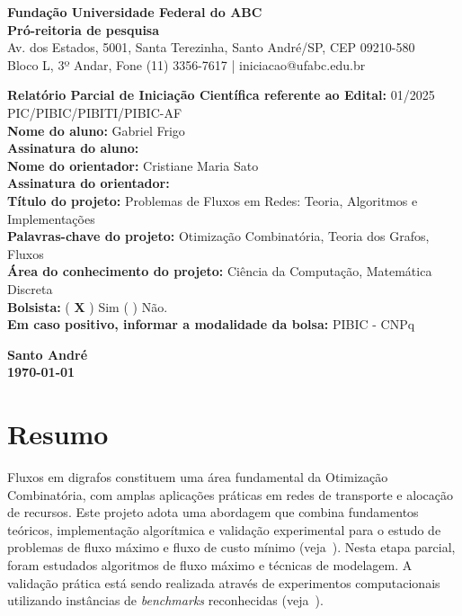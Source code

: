 \documentclass[12pt,a4paper]{article}
\begin{document}
\onehalfspacing

\begin{center}
    \textbf{Fundação Universidade Federal do ABC}\\
    \textbf{Pró-reitoria de pesquisa}\\
    \small Av. dos Estados, 5001, Santa Terezinha, Santo André/SP, CEP 09210-580\\
    Bloco L, 3º Andar, Fone (11) 3356-7617 | iniciacao@ufabc.edu.br
\end{center}

\vspace{0.8cm}

\noindent \textbf{Relatório Parcial de Iniciação Científica referente ao Edital:} 01/2025 PIC\slash PIBIC\slash PIBITI\slash PIBIC-AF \\[0.5cm]
\noindent \textbf{Nome do aluno:} Gabriel Frigo \\[0.5cm]
\noindent \textbf{Assinatura do aluno:} \hrulefill \\[0.5cm]
\noindent \textbf{Nome do orientador:} Cristiane Maria Sato \\[0.5cm]
\noindent \textbf{Assinatura do orientador:} \hrulefill \\[0.5cm]
\noindent \textbf{Título do projeto:} Problemas de Fluxos em Redes: Teoria, Algoritmos e Implementações \\[0.5cm]
\noindent \textbf{Palavras-chave do projeto:} Otimização Combinatória, Teoria dos Grafos, Fluxos \\[0.5cm]
\noindent \textbf{Área do conhecimento do projeto:} Ciência da Computação, Matemática Discreta \\[0.5cm]
\noindent \textbf{Bolsista:} ( \textbf{\textsf{X}} ) Sim \quad ( \quad ) Não. \\
\textbf{Em caso positivo, informar a modalidade da bolsa:} PIBIC - CNPq \\[1cm]

\begin{center}
    \textbf{Santo André}\\
    \textbf{\today}
\end{center}

\newpage
\renewcommand{\contentsname}{Sumário}
\tableofcontents
\newpage

\section{Resumo}
Fluxos em digrafos constituem uma área fundamental da Otimização Combinatória, com amplas aplicações práticas em redes de transporte e alocação de recursos. Este projeto adota uma abordagem que combina fundamentos teóricos, implementação algorítmica e validação experimental para o estudo de problemas de fluxo máximo e fluxo de custo mínimo (veja~\cite{ahuja1993network}). Nesta etapa parcial, foram estudados algoritmos de fluxo máximo e técnicas de modelagem. A validação prática está sendo realizada através de experimentos computacionais utilizando instâncias de \textit{benchmarks} reconhecidas (veja~\cite{Jensen2022}).
\end{document}
